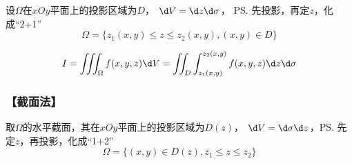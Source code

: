 设$\Omega$在$xOy$平面上的投影区域为$D$， $\d V=\d z\d\sigma$， 
\ps{先投影，再定$z$，化成“2+1”}
$$\Omega=\{z_1(x,y)\leq z\leq z_2(x,y), (x,y)\in D\}$$

\begin{center}
\end{center}

$${I=\iiint_{\Omega}f(x,y,z)\d
V=\iint_D\int_{z_1(x,y)}^{z_2(x,y)}f(x,y,z)\d z\d\sigma}$$

\subsubsection{【截面法】}

取$\Omega$的水平截面，其在$xOy$平面上的投影区域为$D(z)$，
$\d V=\d\sigma \d z$，\ps{先定$z$，再投影，化成“1+2”}
$$\Omega=\{(x,y)\in D(z),z_1\leq z\leq z_2\}$$

\begin{center}
\end{center}

